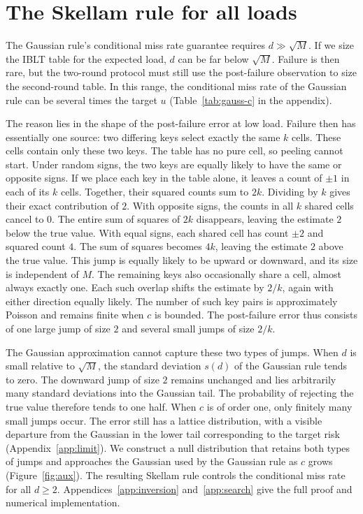 \section{The Skellam rule for all loads}\label{sec:inversion}
The Gaussian rule's conditional miss rate guarantee requires $d\gg\sqrt M$. If we size the IBLT table for the expected load, $d$ can be far below $\sqrt M$. Failure is then rare, but the two-round protocol must still use the post-failure observation to size the second-round table. In this range, the conditional miss rate of the Gaussian rule can be several times the target $u$ (Table~\ref{tab:gauss-c} in the appendix).

The reason lies in the shape of the post-failure error at low load. Failure then has essentially one source: two differing keys select exactly the same $k$ cells. These cells contain only these two keys. The table has no pure cell, so peeling cannot start. Under random signs, the two keys are equally likely to have the same or opposite signs. If we place each key in the table alone, it leaves a count of $\pm1$ in each of its $k$ cells. Together, their squared counts sum to $2k$. Dividing by $k$ gives their exact contribution of $2$. With opposite signs, the counts in all $k$ shared cells cancel to $0$. The entire sum of squares of $2k$ disappears, leaving the estimate $2$ below the true value. With equal signs, each shared cell has count $\pm2$ and squared count $4$. The sum of squares becomes $4k$, leaving the estimate $2$ above the true value. This jump is equally likely to be upward or downward, and its size is independent of $M$. The remaining keys also occasionally share a cell, almost always exactly one. Each such overlap shifts the estimate by $2/k$, again with either direction equally likely. The number of such key pairs is approximately Poisson\cite{arratia1989chen,barbour1992poisson} and remains finite when $c$ is bounded. The post-failure error thus consists of one large jump of size $2$ and several small jumps of size $2/k$.

The Gaussian approximation cannot capture these two types of jumps. When $d$ is small relative to $\sqrt M$, the standard deviation $s(d)$ of the Gaussian rule tends to zero. The downward jump of size $2$ remains unchanged and lies arbitrarily many standard deviations into the Gaussian tail. The probability of rejecting the true value therefore tends to one half. When $c$ is of order one, only finitely many small jumps occur. The error still has a lattice distribution, with a visible departure from the Gaussian in the lower tail corresponding to the target risk (Appendix~\ref{app:limit}). We construct a null distribution that retains both types of jumps and approaches the Gaussian used by the Gaussian rule as $c$ grows (Figure~\ref{fig:aux}). The resulting Skellam rule controls the conditional miss rate for all $d\ge2$. Appendices~\ref{app:inversion} and~\ref{app:search} give the full proof and numerical implementation.

